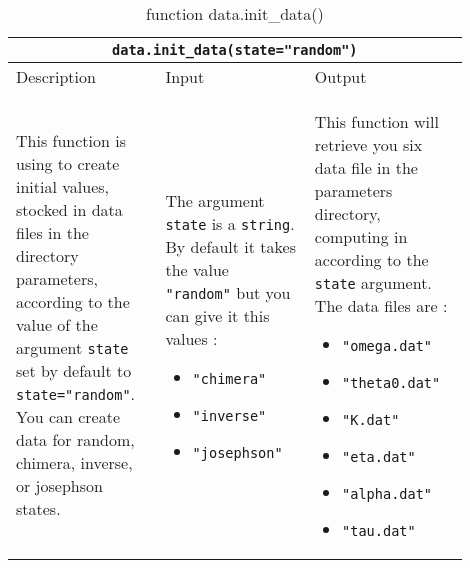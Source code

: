 \documentclass[1pt, a4paper]{article}
\begin{document}
\begin{table}[htbp]
    \begin{center}
        \begin{tabular}{p{0.3\linewidth} p{0.3\linewidth} p{0.3\linewidth}} \toprule
            \multicolumn{3}{c}{\texttt{data.init_data(state="random")}}\\
            \midrule
            \hfil Description & \hfil Input & \hfil Output\\
            \cmidrule(r){1-1} \cmidrule{2-2} \cmidrule(l){3-3}
           
            This function is using to create initial values, stocked in data files in the directory parameters, according to the value of the argument \texttt{state} set by default to \texttt{state="random"}. You can create data for random, chimera, inverse, or josephson states. &
            The argument \texttt{state} is a \texttt{string}. By default it takes the value \texttt{"random"} but you can give it this values :\begin{itemize}
            \setlength{\itemsep}{0pt}
            \item \texttt{"chimera"}
            \item \texttt{"inverse"}
            \item \texttt{"josephson"}
            \end{itemize}
            & This function will retrieve you six data file in the parameters directory, computing in according to the \texttt{state} argument.
            The data files are : \begin{itemize}
            \setlength{\itemsep}{0pt}
            \item \texttt{"omega.dat"}
            \item \texttt{"theta0.dat"}
            \item \texttt{"K.dat"}
            \item \texttt{"eta.dat"}
            \item \texttt{"alpha.dat"}
            \item \texttt{"tau.dat"}
            \end{itemize}\\
            \bottomrule
        \end{tabular}
    \end{center}
    \caption{function data.init\_data()}\label{init_data}
\end{table}\\
\end{document}
